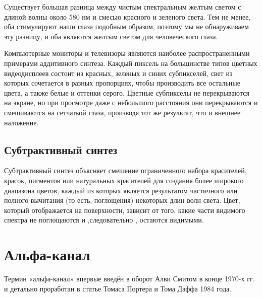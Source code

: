 Существует большая разница между чистым спектральным желтым светом с длиной волны около 580 нм и смесью красного и зеленого света. Тем не менее, оба стимулируют наши глаза подобным образом, поэтому мы не обнаруживаем эту разницу, и оба являются желтым светом для человеческого глаза. 


Компьютерные мониторы и телевизоры являются наиболее распространенными примерами аддитивного синтеза. Каждый пиксель на большинстве типов цветных видеодисплеев состоит из красных, зеленых и синих субпикселей, свет из которых сочетается в разных пропорциях, чтобы производить все остальные цвета, а также белые и оттенки серого. Цветные субпикселы не перекрываются на экране, но при просмотре даже с небольшого  расстояния они перекрываются и смешиваются на сетчаткой глаза, производя тот же результат, что и внешнее наложение.


\subsection{Субтрактивный синтез}
Субтрактивный синтез объясняет смешение ограниченного набора красителей, красок, пигментов или натуральных красителей для создания более широкого диапазона цветов, каждый из которых является результатом частичного или полного вычитания (то есть, поглощения) некоторых длин волн света. Цвет, который отображается на поверхности, зависит от того, какие части видимого спектра не поглощаются и ,следовательно , остаются видимыми.

\begin{figure}[ht!]
\end{figure}

\section{Альфа-канал}
Термин «альфа-канал» впервые введён в оборот Алви Смитом в конце 1970-х гг. и детально проработан в статье Томаса Портера и Тома Даффа 1984 года.

